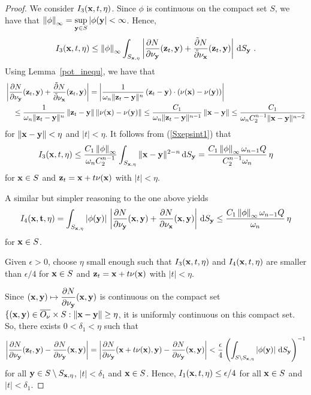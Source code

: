 \begin{proof}
 We consider $I_3(\mathbf{x},t,\eta)$.
Since $\phi$ is continuous on the compact set $S$, we have that
$\displaystyle
\left\|\phi\right\|_{\infty} = \sup_{\mathbf{y}\in S}|\phi(\mathbf{y}| < \infty$.
Hence,
\[
I_3(\mathbf{x},t,\eta)
\leq \left\|\phi\right\|_{\infty} \int_{S_{\mathbf{x},\eta}}
\left| \frac{\partial{N}}{\partial \mathbf{\nu}_{\mathbf{y}}}(\mathbf{z}_t,\mathbf{y}) +
\frac{\tilde{\partial}{N}}{\tilde{\partial}{\mathbf{\nu}_{\mathbf{x}}}}(\mathbf{z}_t,\mathbf{y})\right| \,\mathrm{d}{S}_{\mathbf{y}} \  .
\]
Using Lemma~\ref{pot_inequ}, we have that
\begin{align*}
&\left| \frac{\partial{N}}{\partial \mathbf{\nu}_{\mathbf{y}}}(\mathbf{z}_t,\mathbf{y}) +
\frac{\tilde{\partial}{N}}{\tilde{\partial}{\mathbf{\nu}_{\mathbf{x}}}}(\mathbf{z}_t,\mathbf{y})\right|
= \left| \frac{1}{\omega_n \|\mathbf{z}_t-\mathbf{y}\|^n}\,(\mathbf{z}_t-\mathbf{y})\cdot
(\mathbf{\nu}(\mathbf{x}) - \mathbf{\nu}(\mathbf{y})) \right| \\
&\quad
\leq \frac{1}{\omega_n \|\mathbf{z}_t-\mathbf{y}\|^n}\,\|\mathbf{z}_t-\mathbf{y}\|\,
\|\mathbf{\nu}(\mathbf{x}) - \mathbf{\nu}(\mathbf{y})\|
\leq \frac{C_1}{\omega_n \|\mathbf{z}_t-\mathbf{y}\|^{n-1}}\,\|\mathbf{x}-\mathbf{y}\|
\leq \frac{C_1}{\omega_n C_2^{n-1}\|\mathbf{x}-\mathbf{y}\|^{n-2}}
\end{align*}
for $\|\mathbf{x} - \mathbf{y}\| < \eta$ and $|t| < \eta$.  It follows from
(\ref{Sxepsint1}) that
\[
I_3(\mathbf{x},t,\eta)
\leq \frac{C_1 \left\|\phi\right\|_{\infty}}{\omega_n C_2^{n-1}}
\int_{S_{\mathbf{x},\eta}} \|\mathbf{x}-\mathbf{y}\|^{2-n} \,\mathrm{d}{S}_{\mathbf{y}}
= \frac{C_1 \left\|\phi\right\|_{\infty} \omega_{n-1} Q}{C_2^{n-1}\omega_n}
\, \eta
\]
for $\mathbf{x} \in S$ and
$\mathbf{z}_t = \mathbf{x}+t\mathbf{\nu}(\mathbf{x})$ with $|t|< \eta$.

 A similar but simpler reasoning to the one above yields
\[
I_4(\mathbf{x},\mathbf{t},\eta)
= \int_{S_{\mathbf{x},\eta}} \left|\phi(\mathbf{y})\right|\,
\left| \frac{\partial{N}}{\partial \mathbf{\nu}_{\mathbf{y}}}(\mathbf{x},\mathbf{y}) +
\frac{\partial{N}}{\partial \mathbf{\nu}_{\mathbf{x}}}(\mathbf{x},\mathbf{y})\right| \,\mathrm{d}{S}_{\mathbf{y}}
\leq \frac{C_1 \left\|\phi\right\|_{\infty}\omega_{n-1} Q}{\omega_n}\, \eta
\]
for $\mathbf{x} \in S$.

 Given $\epsilon > 0$, choose $\eta$ small enough such that
$I_3(\mathbf{x},t,\eta)$ and $I_4(\mathbf{x},t,\eta)$ are smaller
than $\epsilon/4$ for $\mathbf{x} \in S$ and
$\mathbf{z}_t = \mathbf{x}+t\mathbf{\nu}(\mathbf{x})$ with $|t|< \eta$.

Since $\displaystyle (\mathbf{x},\mathbf{y}) \mapsto
\frac{\partial{N}}{\partial \mathbf{\nu}_{\mathbf{y}}}(\mathbf{x},\mathbf{y})$ is
continuous on the compact set
$\{(\mathbf{x},\mathbf{y}) \in \overline{O_\nu} \times S :
\|\mathbf{x} - \mathbf{y}\| \geq \eta$,
it is uniformly continuous on this compact set.  So, there exists
$0 < \delta_1 < \eta$ such that
\[
\left| \frac{\partial{N}}{\partial \mathbf{\nu}_{\mathbf{y}}}(\mathbf{z}_t,\mathbf{y}) -
\frac{\partial{N}}{\partial \mathbf{\nu}_{\mathbf{y}}}(\mathbf{x},\mathbf{y})\right|
=\left| \frac{\partial{N}}{\partial \mathbf{\nu}_{\mathbf{y}}}(\mathbf{x} + t \mathbf{\nu}(\mathbf{x}),\mathbf{y}) -
\frac{\partial{N}}{\partial \mathbf{\nu}_{\mathbf{y}}}(\mathbf{x},\mathbf{y})\right|
< \frac{\epsilon}{4} \left(
\int_{S\setminus S_{\mathbf{x},\eta}}\left|\phi(\mathbf{y})\right|
\,\mathrm{d}{S}_{\mathbf{y}} \right)^{-1}
\]
for all $\displaystyle \mathbf{y} \in S \setminus S_{\mathbf{x},\eta}$,
$|t| < \delta_1$ and $\mathbf{x} \in S$.
Hence,
$\displaystyle I_1(\mathbf{x},t,\eta) \leq \epsilon/4$ for all $\mathbf{x} \in S$
and $|t| < \delta_1$.


\end{proof}
